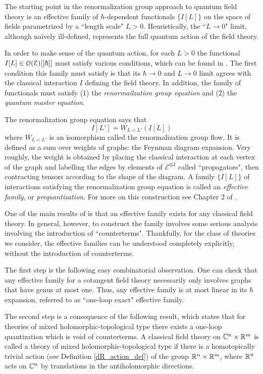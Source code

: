 \documentclass[11pt, oneside, reqno]{amsart}
\theoremstyle{definition} \newtheorem{definition}{Definition}[section]
\theoremstyle{definition}
\theoremstyle{remark}
\theoremstyle{definition} \newtheorem{remark}[definition]{Remark}
\theoremstyle{definition} \newtheorem{remarks}[definition]{Remarks}
\theoremstyle{definition} \newtheorem{question}[definition]{Question}
\theoremstyle{definition} \newtheorem*{note}{Note}
\theoremstyle{definition} \newtheorem{example}[definition]{Example}
\theoremstyle{definition} \newtheorem{examples}[definition]{Examples}
\def\cE{\mathcal E}\def\cF{\mathcal F}\def\cG{\mathcal G}\def\cH{\mathcal H}
\newcommand{\mc}[1]{\mathcal{#1}}
\begin{document}
The starting point in the renormalization group approach to quantum field theory is an effective family of $\hbar$-dependent functionals $\{I[L]\}$ on the space of fields parametrized by a ``length scale" $L > 0$. Heuristically, the ``$L \to 0$" limit, although na\"ively ill-defined, represents the full quantum action of the field theory. 

In order to make sense of the quantum action, for each $L > 0$ the functional $I[L] \in \cO(\cE)[[\hbar]]$ must satisfy various conditions, which can be found in \cite[Definition 8.2.9.1]{Book2}. 
The first condition this family must satisfy is that its $\hbar \to 0$ and $L \to 0$ limit agrees with the classical interaction $I$ defining the field theory. In addition, the family of functionals must satisfy  (1) the {\em renormailzation group equation} and (2) the {\em quantum master equation}. 

The renormalization group equation says that
\[
I[L'] = W_{L<L'} (I[L])
\]
where $W_{L<L'}$ is an isomorphism called the renormalization group flow. 
It is defined as a sum over weights of graphs: the Feynman diagram expansion. 
Very roughly, the weight is obtained by placing the classical interaction at each vertex of the graph and labelling the edges by elements of $\mc E^{\otimes 2}$ called ``propagators", then contracting tensors according to the shape of the diagram. 
A family $\{I[L]\}$ of interactions satisfying the renormalization group equation is called an {\em effective family}, or {\em prequantization}. 
For more on this construction see Chapter 2 of \cite{CostelloBook}.

One of the main results of \cite{CostelloBook} is that an effective family exists for any classical field theory. In general, however, to construct the family involves some serious analysis involving the introduction of ``counterterms". 
Thankfully, for the class of theories we consider, the effective families can be understood completely explicitly, without the introduction of counterterms. 

The first step is the following easy combinatorial observation.  One can check that any effective family for a cotangent field theory necessarily only involves graphs that have genus at most one. Thus, any effective family is at most linear in its $\hbar$ expansion, referred to as ``one-loop exact" effective family.

The second step is a consequence of the following result, which states that for theories of mixed holomorphic-topological type there exists a one-loop quantization which is void of counterterms.  A classical field theory on $\mathbb C^n \times \mathbb R^m$ is called a theory of mixed holomorphic-topological type if there is a homotopically trivial action (see Definition \ref{dR_action_def}) of the group $\mathbb R^n \times \mathbb R^m$, where $\mathbb R^n$ acts on $\mathbb C^n$ by translations in the antiholomorphic directions.
\end{document}
